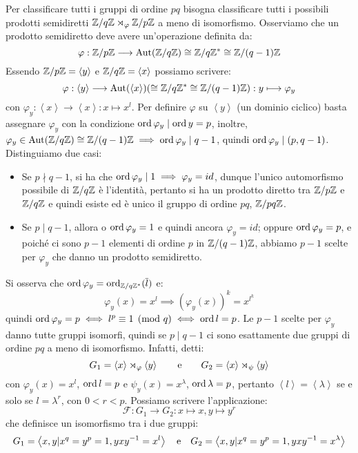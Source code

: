 \documentclass[11pt]{scrartcl}
\begin{document}
Per classificare tutti i gruppi di ordine $pq$ bisogna classificare tutti i possibili prodotti semidiretti $\mathbb Z/q\mathbb Z \rtimes_{\varphi} {\mathbb Z}/p{\mathbb Z}$ a meno di isomorfismo.
Osserviamo che un prodotto semidiretto deve avere un'operazione definita da:
\[ \varphi : {\mathbb Z}/p{\mathbb Z} \longrightarrow \operatorname{Aut}(\mathbb Z/q\mathbb Z) \cong \mathbb Z/q\mathbb Z^* \cong \mathbb Z/(q-1)\mathbb Z
            \]
Essendo ${\mathbb Z}/p{\mathbb Z} = \left<y\right>$ e $\mathbb Z/q\mathbb Z = \left<x\right>$ possiamo scrivere:
    \[ \varphi : \left<y\right> \longrightarrow \operatorname{Aut}(\left<x\right>) (\cong \mathbb Z/q\mathbb Z^* \cong \mathbb Z/(q-1)\mathbb Z) : y \longmapsto \varphi_y
            \]
con $\varphi_y : \left<x\right> \longrightarrow \left<x\right> : x \longmapsto x^l$. Per definire $\varphi$ su $\left<y\right>$ (un dominio ciclico)
basta assegnare $\varphi_y$ con la condizione $\operatorname{ord} \varphi_y \mid \operatorname{ord} y = p$, inoltre, $\varphi_y \in \operatorname{Aut}(\mathbb{Z}/{q}\mathbb{Z}) \cong \mathbb{Z}/{(q-1)}\mathbb{Z} \implies \operatorname{ord} \varphi_y \mid q-1$, 
quindi $\operatorname{ord} \varphi_y \mid (p,q-1)$. Distinguiamo due casi:
    \begin{itemize}
        \item Se $p \nmid q-1$, si ha che $\operatorname{ord} \varphi_y \mid 1 \implies \varphi_y = id$, dunque l'unico automorfismo possibile di $\mathbb{Z}/{q}\mathbb{Z}$ è l'identità, pertanto si ha un prodotto diretto tra $\mathbb{Z}/{p}\mathbb{Z}$ e
            $\mathbb{Z}/{q}\mathbb{Z}$ e quindi esiste ed è unico il gruppo di ordine $pq$, $\mathbb{Z}/{pq}\mathbb{Z}$.  
        \item Se $p \mid q-1$, allora o $\operatorname{ord} \varphi_y = 1$ e quindi ancora $\varphi_y = id$; oppure $\operatorname{ord} \varphi_y = p$, e poiché ci sono $p-1$ elementi di ordine $p$ in $\mathbb{Z}/{(q-1)}\mathbb{Z}$, abbiamo $p-1$
            scelte per $\varphi_y$ che danno un prodotto semidiretto.
    \end{itemize}
Si osserva che $\operatorname{ord} \varphi_y = \operatorname{ord}_{\mathbb{Z}/{q}\mathbb{Z}^*}(\overline l)$ e:
    \[ \varphi_y(x) = x^l \implies (\varphi_y(x))^k = x^{l^k}
        \]
quindi $\operatorname{ord} \varphi_y = p \iff l^p \equiv 1 \pmod q \iff \operatorname{ord} l = p$.
Le $p-1$ scelte per $\varphi_y$ danno tutte gruppi isomorfi, quindi se $p \mid q-1$ ci sono esattamente due gruppi di ordine $pq$ a meno di isomorfismo. Infatti, detti:
    \[ G_1 = \left<x\right> \rtimes_{\varphi} \left<y\right>
    \qquad \text e \qquad 
    G_2 = \left<x\right> \rtimes_{\psi} \left<y\right>
        \]
con $\varphi_y(x) = x^l$, $\operatorname{ord} l = p$ e $\psi_y(x) = x^\lambda$, $\operatorname{ord} \lambda = p$, pertanto $\left<l\right> = \left<\lambda\right>$ se e solo se 
$l = \lambda^r$, con $0 < r < p$. Possiamo scrivere l'applicazione:
    \[ \mathcal{F} : G_1 \longrightarrow G_2 : x \longmapsto x, y \longmapsto y^r
        \]
che definisce un isomorfismo tra i due gruppi:
    \[ G_1 = \left<x,y | x^q = y^p = 1, yxy^{-1} = x^l\right> \quad \text e \quad G_2 = \left<x,y | x^q = y^p = 1, yxy^{-1} = x^\lambda\right>
        \]
\end{document}
